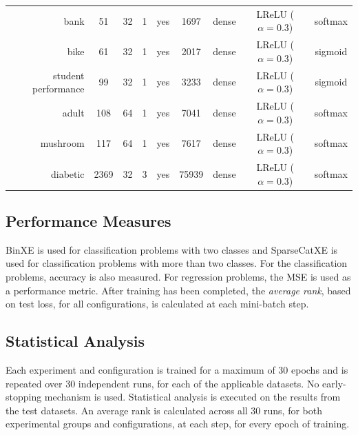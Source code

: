 \documentclass[preprint,review,12pt]{elsarticle}
\begin{document}
\begin{table}[htb]
{\begin{tabular}{rcccccccc}
			bank                & 51              & 32              & 1               & yes             & 1697                & dense             & LReLU ($\alpha = 0.3$) & softmax                \\
			bike                & 61              & 32              & 1               & yes             & 2017                & dense             & LReLU ($\alpha = 0.3$) & sigmoid                \\
			student performance & 99              & 32              & 1               & yes             & 3233                & dense             & LReLU ($\alpha = 0.3$) & sigmoid                \\
			adult               & 108             & 64              & 1               & yes             & 7041                & dense             & LReLU ($\alpha = 0.3$) & softmax                \\
			mushroom            & 117             & 64              & 1               & yes             & 7617                & dense             & LReLU ($\alpha = 0.3$) & softmax                \\
			diabetic            & 2369            & 32              & 3               & yes             & 75939               & dense             & LReLU ($\alpha = 0.3$) & softmax                \\
		\end{tabular}%
	}
\end{table}%


\subsection{Performance Measures}\label{sec:methodology:performance_measures}

\Acf{BinXE} is used for classification problems with two classes and \acf{SparseCatXE} is used for classification problems with more than two classes. For the classification problems, accuracy is also measured. For regression problems, the \acf{MSE} is used as a performance metric. After training has been completed, the \textit{average rank}, based on test loss, for all configurations, is calculated at each mini-batch step.


\subsection{Statistical Analysis}
\label{sec:methodology:statistical_analysis}

Each experiment and configuration is trained for a maximum of 30 epochs and is repeated over 30 independent runs, for each of the applicable datasets. No early-stopping mechanism is used. Statistical analysis is executed on the results from the test datasets. An average rank is calculated across all 30 runs, for both experimental groups and configurations, at each step, for every epoch of training.
\end{document}

